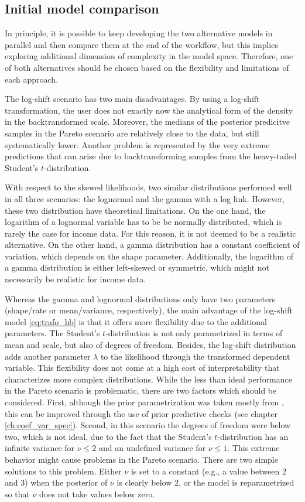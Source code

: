 \subsection{Initial model comparison}

In principle, it is possible to keep developing the two alternative models in parallel and then compare them at the end of the workflow, but this implies exploring additional dimension of complexity in the model space.
Therefore, one of both alternatives should be chosen based on the flexibility and limitations of each approach.

The log-shift scenario has two main disadvantages.
By using a log-shift transformation, the user does not exactly now the analytical form of the density in the backtransformed scale.
Moreover, the medians of the posterior predicitve samples in the Pareto scenario are relatively close to the data, but still systematically lower.
Another problem is represented by the very extreme predictions that can arise due to backtransforming samples from the heavy-tailed Student's $t$-distribution.

With respect to the skewed likelihoods, two similar distributions performed well in all three scenarios: the lognormal and the gamma with a log link.
However, these two distribution have theoretical limitations.
On the one hand, the logarithm of a lognormal variable has to be be normally distributed, which is rarely the case for income data.
For this reason, it is not deemed to be a realistic alternative.
On the other hand, a gamma distribution has a constant coefficient of variation, which depends on the shape parameter.
Additionally, the logarithm of a gamma distribution is either left-skewed or symmetric, which might not necessarily be realistic for income data.

Whereas the gamma and lognormal distributions only have two parameters (shape/rate or mean/variance, respectively), the main advantage of the log-shift model \ref{eq:trafo_hb} is that it offers more flexibility due to the additional parameters.
The Student's $t$-distribution is not only parametrized in terms of mean and scale, but also of degrees of freedom.
Besides, the log-shift distribution adds another parameter $\lambda$ to the likelihood through the transformed dependent variable.
This flexibility does not come at a high cost of interpretability that characterizes more complex distributions.
While the less than ideal performance in the Pareto scenario is problematic, there are two factors which should be considered.
First, although the prior parametrization was taken mostly from \cite{morelli_hierarchical_2021},
this can be improved through the use of prior predictive checks (see chapter \ref{ch:coef_var_spec}).
Second, in this scenario the degrees of freedom were below two, which is not ideal, due to the fact that the Student's $t$-distribution has an infinite variance for $\nu \le 2$ and an undefined variance for $\nu \le 1$.
This extreme behavior might cause problems in the Pareto scenario.
There are two simple solutions to this problem.
Either $\nu$ is set to a constant (e.g., a value between 2 and 3) when the posterior of $\nu$ is clearly below 2, or the model is reparametrized so that $\nu$ does not take values below zero.


